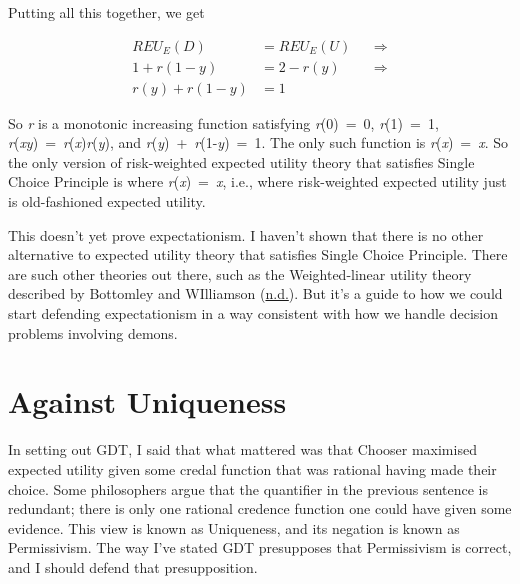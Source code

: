 \documentclass[
  12pt,
  letterpaper,
  DIV=11,
  numbers=noendperiod]{scrreprt}
\begin{document}
Putting all this together, we get

\begin{align*}
REU_E(D) &= REU_E(U)  && \Rightarrow \\
1 + r(1-y) &= 2 - r(y) && \Rightarrow \\
r(y) + r(1-y) &= 1
\end{align*}

So \emph{r} is a monotonic increasing function satisfying
\emph{r}(0)~=~0, \emph{r}(1)~=~1,
\emph{r}(\emph{xy})~=~\emph{r}(\emph{x})\emph{r}(\emph{y}), and
\emph{r}(\emph{y})~+~\emph{r}(1-\emph{y})~=~1. The only such function is
\emph{r}(\emph{x})~=~\emph{x}. So the only version of risk-weighted
expected utility theory that satisfies Single Choice Principle is where
\emph{r}(\emph{x})~=~\emph{x}, i.e., where risk-weighted expected
utility just is old-fashioned expected utility.

This doesn't yet prove expectationism. I haven't shown that there is no
other alternative to expected utility theory that satisfies Single
Choice Principle. There are such other theories out there, such as the
Weighted-linear utility theory described by Bottomley and WIlliamson
(\protect\hyperlink{ref-BottomleyWilliamsonnd}{n.d.}). But it's a guide
to how we could start defending expectationism in a way consistent with
how we handle decision problems involving demons.

\hypertarget{sec-unique}{%
\chapter{Against Uniqueness}\label{sec-unique}}

In setting out GDT, I said that what mattered was that Chooser maximised
expected utility given some credal function that was rational having
made their choice. Some philosophers argue that the quantifier in the
previous sentence is redundant; there is only one rational credence
function one could have given some evidence. This view is known as
Uniqueness, and its negation is known as Permissivism. The way I've
stated GDT presupposes that Permissivism is correct, and I should defend
that presupposition.
\end{document}

